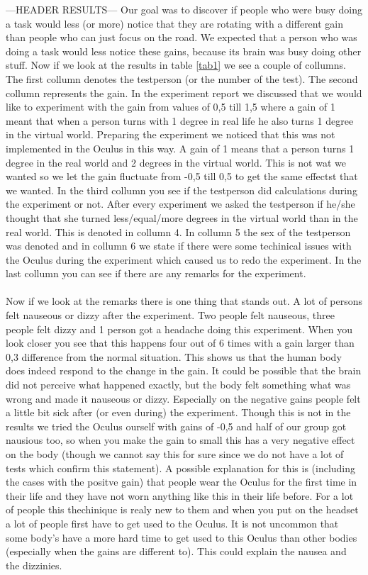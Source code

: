 ---HEADER RESULTS---
Our goal was to discover if people who were busy doing a task would less (or more) notice that they are rotating with a different gain than people who can just focus on the road. We expected that a person who was doing a task would less notice these gains, because its brain was busy doing other stuff. Now if we look at the results in table \ref{tab1} we see a couple of collumns. The first collumn denotes the testperson (or the number of the test). The second collumn represents the gain. In the experiment report we discussed that we would like to experiment with the gain from values of 0,5 till 1,5 where a gain of 1 meant that when a person turns with 1 degree in real life he also turns 1 degree in the virtual world. Preparing the experiment we noticed that this was not implemented in the Oculus in this way. A gain of 1 means that a person turns 1 degree in the real world and 2 degrees in the virtual world. This is not wat we wanted so we let the gain fluctuate from -0,5 till 0,5 to get the same effectst that we wanted. In the third collumn you see if the testperson did calculations during the experiment or not. After every experiment we asked the testperson if he/she thought that she turned less/equal/more degrees in the virtual world than in the real world. This is denoted in collumn 4. In collumn 5 the sex of the testperson was denoted and in collumn 6 we state if there were some techinical issues with the Oculus during the experiment which caused us to redo the experiment. In the last collumn you can see if there are any remarks for the experiment.\\
\\
Now if we look at the remarks there is one thing that stands out. A lot of persons felt nauseous or dizzy after the experiment. Two people felt nauseous, three people felt dizzy and 1 person got a headache doing this experiment. When you look closer you see that this happens four out of 6 times with a gain larger than 0,3 difference from the normal situation. This shows us that the human body does indeed respond to the change in the gain. It could be possible that the brain did not perceive what happened exactly, but the body felt something what was wrong and made it nauseous or dizzy. Especially on the negative gains people felt a little bit sick after (or even during) the experiment. Though this is not in the results we tried the Oculus ourself with gains of -0,5 and half of our group got nausious too, so when you make the gain to small this has a very negative effect on the body (though we cannot say this for sure since we do not have a lot of tests which confirm this statement). A possible explanation for this is (including the cases with the positve gain) that people wear the Oculus for the first time in their life and they have not worn anything like this in their life before. For a lot of people this thechinique is realy new to them and when you put on the headset a lot of people first have to get used to the Oculus. It is not uncommon that some body's have a more hard time to get used to this Oculus than other bodies (especially when the gains are different to). This could explain the nausea and the dizzinies.\\
